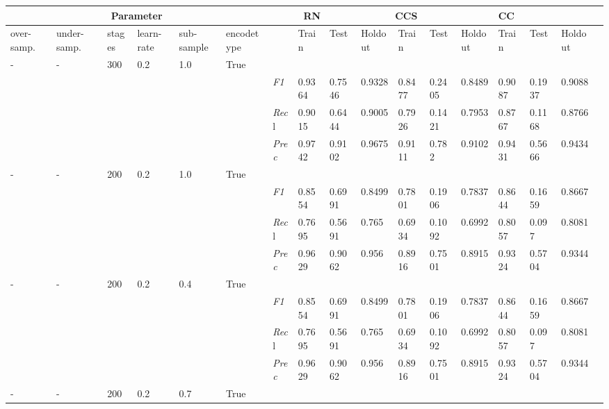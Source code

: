 \begin{table}[]
\tiny
\tabcolsep=0.11cm
\begin{tabularx}{\textwidth}{XXXXXX|X|XXX|XXX|XXXX}
\toprule
\multicolumn{6}{c}{Parameter} & \multicolumn{3}{c}{RN} & \multicolumn{3}{c}{CCS} & \multicolumn{3}{c}{CC} \\ \midrule
over-\newline samp. & under-\newline samp. & stages &learn-\newline rate & sub-\newline sample & encode\newline type & & Train &  Test & Holdout & Train &  Test & Holdout & Train &  Test & Holdout \\ \midrule
- & - & 300 & 0.2 & 1.0 &True & & & & & & & & & \\
& & & & & & \textit{F1} & 0.9364 & 0.7546 & 0.9328 & 0.8477 & 0.2405        & 0.8489        & 0.9087        & 0.1937        & 0.9088        \\
& & & & & & \textit{Rec}l & 0.9015 & 0.6444 & 0.9005    & 0.7926 & 0.1421    & 0.7953    & 0.8767    & 0.1168    & 0.8766    \\
& & & & & & \textit{Prec} & 0.9742 & 0.9102 & 0.9675 & 0.9111 & 0.782 & 0.9102 & 0.9431 & 0.5666 & 0.9434 \\ \midrule
- & - & 200 & 0.2 & 1.0 &True & & & & & & & & & \\
& & & & & & \textit{F1} & 0.8554 & 0.6991 & 0.8499 & 0.7801 & 0.1906        & 0.7837        & 0.8644        & 0.1659        & 0.8667        \\
& & & & & & \textit{Rec}l & 0.7695 & 0.5691 & 0.765    & 0.6934 & 0.1092    & 0.6992    & 0.8057    & 0.097    & 0.8081    \\
& & & & & & \textit{Prec} & 0.9629 & 0.9062 & 0.956 & 0.8916 & 0.7501 & 0.8915 & 0.9324 & 0.5704 & 0.9344 \\ \midrule
- & - & 200 & 0.2 & 0.4 &True & & & & & & & & & \\
& & & & & & \textit{F1} & 0.8554 & 0.6991 & 0.8499 & 0.7801 & 0.1906        & 0.7837        & 0.8644        & 0.1659        & 0.8667        \\
& & & & & & \textit{Rec}l & 0.7695 & 0.5691 & 0.765    & 0.6934 & 0.1092    & 0.6992    & 0.8057    & 0.097    & 0.8081    \\
& & & & & & \textit{Prec} & 0.9629 & 0.9062 & 0.956 & 0.8916 & 0.7501 & 0.8915 & 0.9324 & 0.5704 & 0.9344 \\ \midrule
- & - & 200 & 0.2 & 0.7 &True & & & & & & & & & \\

\end{tabularx}
\end{table}
